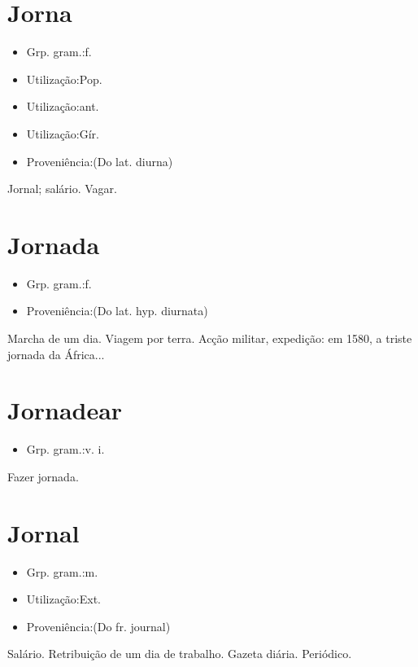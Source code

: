 \documentclass{article}
\begin{document}
\section{Jorna}
\begin{itemize}
\item {Grp. gram.:f.}
\end{itemize}
\begin{itemize}
\item {Utilização:Pop.}
\end{itemize}
\begin{itemize}
\item {Utilização:ant.}
\end{itemize}
\begin{itemize}
\item {Utilização:Gír.}
\end{itemize}
\begin{itemize}
\item {Proveniência:(Do lat. \textunderscore diurna\textunderscore )}
\end{itemize}
Jornal; salário.
Vagar.
\section{Jornada}
\begin{itemize}
\item {Grp. gram.:f.}
\end{itemize}
\begin{itemize}
\item {Proveniência:(Do lat. hyp. \textunderscore diurnata\textunderscore )}
\end{itemize}
Marcha de um dia.
Viagem por terra.
Acção militar, expedição: \textunderscore em 1580, a triste jornada da África...\textunderscore 
\section{Jornadear}
\begin{itemize}
\item {Grp. gram.:v. i.}
\end{itemize}
Fazer jornada.
\section{Jornal}
\begin{itemize}
\item {Grp. gram.:m.}
\end{itemize}
\begin{itemize}
\item {Utilização:Ext.}
\end{itemize}
\begin{itemize}
\item {Proveniência:(Do fr. \textunderscore journal\textunderscore )}
\end{itemize}
Salário.
Retribuição de um dia de trabalho.
Gazeta diária.
Periódico.
\end{document}
